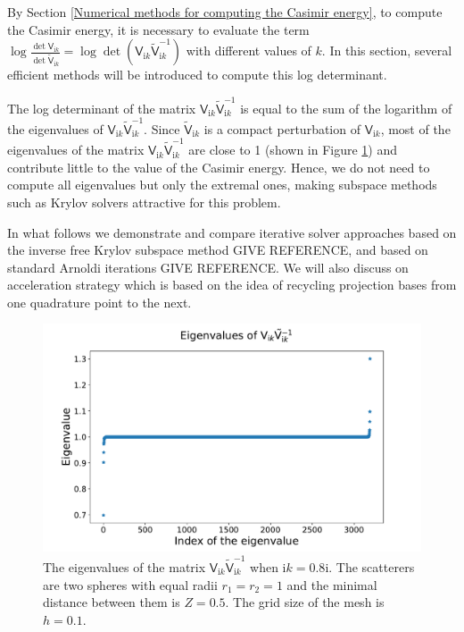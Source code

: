 

By Section \ref{Numerical methods for computing the Casimir energy}, to compute the Casimir energy, it is necessary to evaluate the term
$\log\frac{\det\mathsf{V}_{\mathrm{i}k}}{\det\tilde{\mathsf{V}}_{\mathrm{i}k}} = \log\det(\mathsf{V}_{\mathrm{i}k}\tilde{\mathsf{V}}_{\mathrm{i}k}^{-1})$ 
with different values of $k$. In this section, several efficient methods will be introduced to compute this log determinant.

The log determinant of the matrix $\mathsf{V}_{\mathrm{i}k}\tilde{\mathsf{V}}_{\mathrm{i}k}^{-1}$ is equal to the sum of the logarithm of the eigenvalues of 
$\mathsf{V}_{\mathrm{i}k}\tilde{\mathsf{V}}_{\mathrm{i}k}^{-1}$. Since $\tilde{\mathsf{V}}_{\mathrm{i}k}$ is a compact perturbation of $\mathsf{V}_{\mathrm{i}k}$,
most of the eigenvalues of the matrix $\mathsf{V}_{\mathrm{i}k}\tilde{\mathsf{V}}_{\mathrm{i}k}^{-1}$ are close to 1 
(shown in Figure \ref{eigenvalues of VVtilde}) and contribute little to the value of the Casimir energy. Hence, we do not need to compute all eigenvalues but only
the extremal ones, making subspace methods such as Krylov solvers attractive for this problem.

In what follows we demonstrate and compare iterative solver approaches based on the inverse free Krylov subspace method {\color{red} GIVE REFERENCE}, and based on standard Arnoldi iterations {\color{red} GIVE REFERENCE}.
We will also discuss on acceleration strategy which is based on the idea of recycling projection bases from one quadrature point to the next. 


\begin{figure}[H]
    \centering
    \includegraphics[scale = 0.5]{figures/eigenvalue_of_VVtilde.pdf}
    \caption{The eigenvalues of the matrix $\mathsf{V}_{\mathrm{i}k}\tilde{\mathsf{V}}_{\mathrm{i}k}^{-1}$ when $\mathrm{i}k = 0.8\mathrm{i}$.
    The scatterers are two spheres with equal radii $r_{1} = r_{2} = 1$ and the minimal distance between them is $Z = 0.5$. The grid size of the mesh is $h = 0.1$.}
    \label{eigenvalues of VVtilde}
\end{figure}

